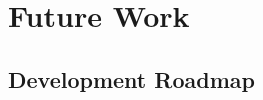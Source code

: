 \chapter{Future Work}
\label{ch:future-work}

\section{Development Roadmap}
\label{sec:future-roadmap}


